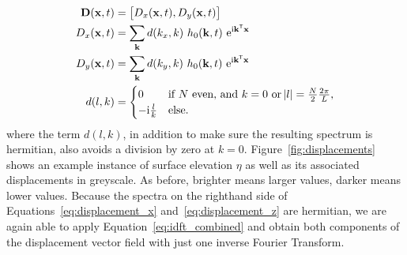 \begin{align}
 \mathbf{D}(\mathbf{x},t) &= \left[D_x(\mathbf{x},t), D_y(\mathbf{x},t)\right]\\
\label{eq:displacement_x} D_x(\mathbf{x},t) &= \sum_{\mathbf{k}}d(k_x, 
k)~h_0(\mathbf{k},t)~\mathrm{e}^{\mathrm{i}\mathbf{k}^{\mathsf{T}}\mathbf{x}} \\
\label{eq:displacement_z} D_y(\mathbf{x},t) &= \sum_{\mathbf{k}}d(k_y, 
k)~h_0(\mathbf{k},t)~\mathrm{e}^{\mathrm{i}\mathbf{k}^{\mathsf{T}}\mathbf{x}} \\
 d(l, k) &= \begin{cases}
             0 &\text{if $N$ even, and $k = 0$ or $\abs{l} = 
\frac{N}{2}\frac{2\pi}{L}$,} \\
             -\mathrm{i}\frac{l}{k} &\text{else.}
            \end{cases}
\end{align}
where the term $d(l, k)$, in addition to make sure the resulting spectrum is 
hermitian, also avoids a division by zero at $k = 0$. 
Figure~\ref{fig:displacements} shows an example instance of surface elevation 
$\eta$ as well as its associated displacements in greyscale. As before, 
brighter means larger values, darker means lower values. 
Because the spectra on the righthand side of Equations~\ref{eq:displacement_x} 
and~\ref{eq:displacement_z} are hermitian, we are again able to apply 
Equation~\ref{eq:idft_combined} and obtain both components of the displacement 
vector field with just one inverse Fourier Transform.\\


